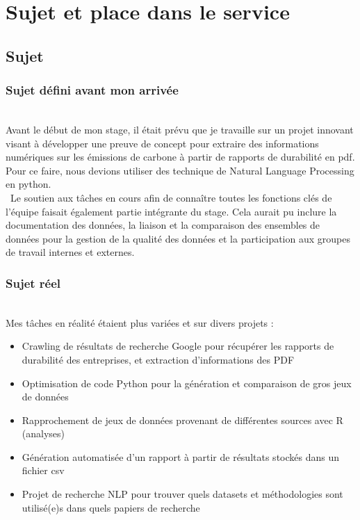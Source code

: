 \section{Sujet et place dans le service}
\subsection{Sujet}
\subsubsection{Sujet défini avant mon arrivée}
~\\
Avant le début de mon stage, il était prévu que je travaille sur un projet innovant visant à développer une preuve de concept pour extraire des informations numériques sur les émissions de carbone à partir de rapports de durabilité en pdf. 
Pour ce faire, nous devions utiliser des technique de Natural Language Processing en python.\\

~Le soutien aux tâches en cours afin de connaître toutes les fonctions clés de l'équipe faisait également partie intégrante du stage. 
Cela aurait pu inclure la documentation des données, la liaison et la comparaison des ensembles de données pour la gestion de la qualité des données et la participation aux groupes de travail internes et externes.


\subsubsection{Sujet réel}
~\\
Mes tâches en réalité étaient plus variées et sur divers projets :
\begin{itemize}
    \item Crawling de résultats de recherche Google pour récupérer les rapports de durabilité des entreprises, et extraction d'informations des PDF
    \item Optimisation de code Python pour la génération et comparaison de gros jeux de données
    \item Rapprochement de jeux de données provenant de différentes sources avec R (analyses)
    \item Génération automatisée d'un rapport à partir de résultats stockés dans un fichier csv
    \item Projet de recherche NLP pour trouver quels datasets et méthodologies sont utilisé(e)s dans quels papiers de recherche
\end{itemize}


